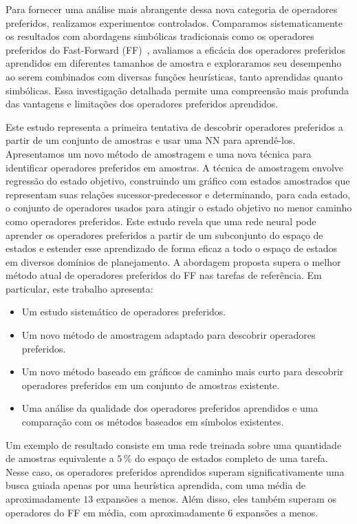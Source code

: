 \documentclass[ppgc,diss,english]{iiufrgs}
\begin{document}
Para fornecer uma análise mais abrangente dessa nova categoria de operadores preferidos, realizamos experimentos controlados. Comparamos sistematicamente os resultados com abordagens simbólicas tradicionais como os operadores preferidos do Fast-Forward (FF)~\cite{Hoffmann.Nebel/2001, Helmert/2006}, avaliamos a eficácia dos operadores preferidos aprendidos em diferentes tamanhos de amostra e exploraramos seu desempenho ao serem combinados com diversas funções heurísticas, tanto aprendidas quanto simbólicas. Essa investigação detalhada permite uma compreensão mais profunda das vantagens e limitações dos operadores preferidos aprendidos.

Este estudo representa a primeira tentativa de descobrir operadores preferidos a partir de um conjunto de amostras e usar uma NN para aprendê-los. Apresentamos um novo método de amostragem e uma nova técnica para identificar operadores preferidos em amostras. A técnica de amostragem envolve regressão do estado objetivo, construindo um gráfico com estados amostrados que representam suas relações sucessor-predecessor e determinando, para cada estado, o conjunto de operadores usados para atingir o estado objetivo no menor caminho como operadores preferidos. Este estudo revela que uma rede neural pode aprender os operadores preferidos a partir de um subconjunto do espaço de estados e estender esse aprendizado de forma eficaz a todo o espaço de estados em diversos domínios de planejamento. A abordagem proposta supera o melhor método atual de operadores preferidos do FF nas tarefas de referência. Em particular, este trabalho apresenta:

\begin{itemize}
\item Um estudo sistemático de operadores preferidos.
\item Um novo método de amostragem adaptado para descobrir operadores preferidos.
\item Um novo método baseado em gráficos de caminho mais curto para descobrir operadores preferidos em um conjunto de amostras existente.
\item Uma análise da qualidade dos operadores preferidos aprendidos e uma comparação com os métodos baseados em símbolos existentes.
\end{itemize}

Um exemplo de resultado consiste em uma rede treinada sobre uma quantidade de amostras equivalente a $5\,\%$ do espaço de estados completo de uma tarefa. Nesse caso, os operadores preferidos aprendidos superam significativamente uma busca guiada apenas por uma heurística aprendida, com uma média de aproximadamente $13$ expansões a menos. Além disso, eles também superam os operadores do FF em média, com aproximadamente $6$ expansões a menos.
\end{document}

